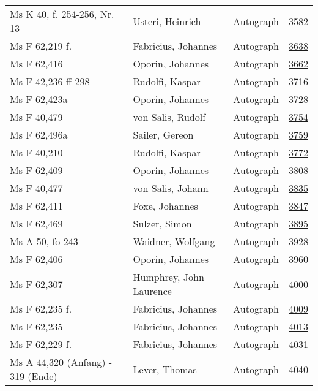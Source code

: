 \documentclass[10pt,a4paper,landscape]{report}
\begin{document}
\begin{longtable}{p{16cm}p{4cm}lr}
Ms K 40, f. 254-256, Nr. 13	&	Usteri, Heinrich	&	Autograph	&	\href{http://130.60.24.72/assignment/3582}{3582}\\
Ms F 62,219 f.	&	Fabricius, Johannes	&	Autograph	&	\href{http://130.60.24.72/assignment/3638}{3638}\\
Ms F 62,416	&	Oporin, Johannes	&	Autograph	&	\href{http://130.60.24.72/assignment/3662}{3662}\\
Ms F 42,236 ff-298	&	Rudolfi, Kaspar	&	Autograph	&	\href{http://130.60.24.72/assignment/3716}{3716}\\
Ms F 62,423a	&	Oporin, Johannes	&	Autograph	&	\href{http://130.60.24.72/assignment/3728}{3728}\\
Ms F 40,479	&	von Salis, Rudolf	&	Autograph	&	\href{http://130.60.24.72/assignment/3754}{3754}\\
Ms F 62,496a	&	Sailer, Gereon	&	Autograph	&	\href{http://130.60.24.72/assignment/3759}{3759}\\
Ms F 40,210	&	Rudolfi, Kaspar	&	Autograph	&	\href{http://130.60.24.72/assignment/3772}{3772}\\
Ms F 62,409	&	Oporin, Johannes	&	Autograph	&	\href{http://130.60.24.72/assignment/3808}{3808}\\
Ms F 40,477	&	von Salis, Johann	&	Autograph	&	\href{http://130.60.24.72/assignment/3835}{3835}\\
Ms F 62,411	&	Foxe, Johannes	&	Autograph	&	\href{http://130.60.24.72/assignment/3847}{3847}\\
Ms F 62,469	&	Sulzer, Simon	&	Autograph	&	\href{http://130.60.24.72/assignment/3895}{3895}\\
Ms A 50, fo 243	&	Waidner, Wolfgang	&	Autograph	&	\href{http://130.60.24.72/assignment/3928}{3928}\\
Ms F 62,406	&	Oporin, Johannes	&	Autograph	&	\href{http://130.60.24.72/assignment/3960}{3960}\\
Ms F 62,307	&	Humphrey, John Laurence	&	Autograph	&	\href{http://130.60.24.72/assignment/4000}{4000}\\
Ms F 62,235 f.	&	Fabricius, Johannes	&	Autograph	&	\href{http://130.60.24.72/assignment/4009}{4009}\\
Ms F 62,235	&	Fabricius, Johannes	&	Autograph	&	\href{http://130.60.24.72/assignment/4013}{4013}\\
Ms F 62,229 f.	&	Fabricius, Johannes	&	Autograph	&	\href{http://130.60.24.72/assignment/4031}{4031}\\
Ms A 44,320 (Anfang) - 319 (Ende)	&	Lever, Thomas	&	Autograph	&	\href{http://130.60.24.72/assignment/4040}{4040}\\

\end{longtable}
\end{document}

